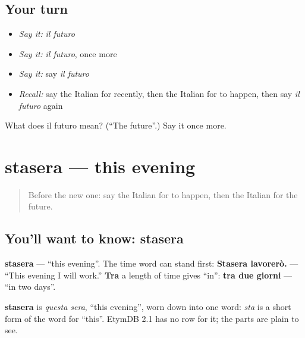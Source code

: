 \subsection*{Your turn}
\begin{itemize}
\raggedright
  \item \emph{Say it:} \emph{il futuro}
  \item \emph{Say it:} \emph{il futuro}, once more
  \item \emph{Say it:} say \emph{il futuro}
  \item \emph{Recall:} say the Italian for recently, then the Italian for to happen, then say \emph{il futuro} again
\end{itemize}

\begin{tcolorbox}[breakable,colback=teal!4,colframe=teal!35!black,title={Before you move on}]
What does il futuro mean? (\textquotedblleft{}The future\textquotedblright{}.) Say it once more.
\end{tcolorbox}
\section[stasera]{stasera — this evening}

\label{lesson:IT-C138-stasera}



\begin{quote}
Before the new one: say the Italian for to happen, then the Italian for the future.
\end{quote}

\subsection*{You'll want to know: stasera}
\textbf{stasera} — \textquotedblleft{}this evening\textquotedblright{}. The time word can stand first: \textbf{Stasera lavorerò.} — \textquotedblleft{}This evening I will work.\textquotedblright{} \textbf{Tra} a length of time gives \textquotedblleft{}in\textquotedblright{}: \textbf{tra due giorni} — \textquotedblleft{}in two days\textquotedblright{}.

\begin{cousinweb}
\textbf{stasera} is \emph{questa sera}, \textquotedblleft{}this evening\textquotedblright{}, worn down into one word: \emph{sta} is a short form of the word for \textquotedblleft{}this\textquotedblright{}. EtymDB 2.1 has no row for it; the parts are plain to see.
\end{cousinweb}

